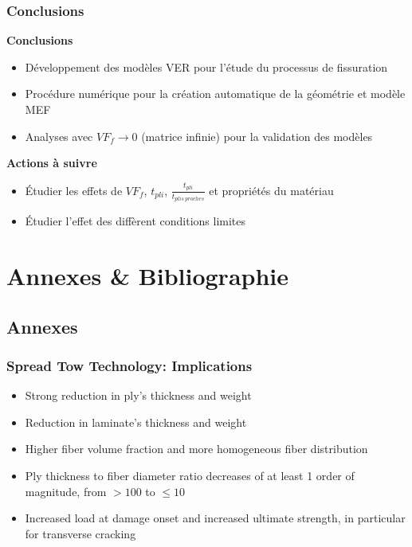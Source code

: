 \documentclass[first,firstsupp,lastsupp,handout,last,hyperref,table]{ETHclass}
\begin{document}
\begin{frame}
\frametitle{\vspace*{0.5cm} Conclusions}
\vspace{-0.75cm}
\centering
\scriptsize
\begin{alertblock}{\footnotesize \bf{Conclusions}}
\begin{itemize}
   	\item D\'eveloppement des mod\`eles VER pour l'\'etude du processus de fissuration
	\item Proc\'edure num\'erique pour la cr\'eation automatique de la g\'eom\'etrie et mod\`ele MEF
	\item Analyses avec $VF_{f}\to 0$ (matrice infinie) pour la validation des mod\`eles
\end{itemize}
\end{alertblock}
\begin{alertblock}{\footnotesize \bf{Actions \`a suivre}}
\begin{itemize}
	\item \'Etudier les effets de $VF_{f}$, $t_{pli}$, $\frac{t_{pli}}{t_{plis\ proches}}$ et propri\'et\'es du mat\'eriau\\[9pt]
	\item \'Etudier l'effet des diff\`erent conditions limites
\end{itemize}
\end{alertblock}
\end{frame}

\section{Annexes \& Bibliographie}

\subsection{Annexes}


\begin{frame}
\frametitle{Spread Tow Technology: Implications}
\vspace{-0.75cm}
\centering
\begin{itemize}
	\item Strong reduction in ply's thickness and weight
	\item Reduction in laminate's thickness and weight
	\item Higher fiber volume fraction and more homogeneous fiber distribution
	\item Ply thickness to fiber diameter ratio decreases of at least 1 order of magnitude, from $>100$ to $\leq10$
	\item Increased load at damage onset and increased ultimate strength, in particular for transverse cracking
\end{itemize}
\end{frame}
\end{document}
